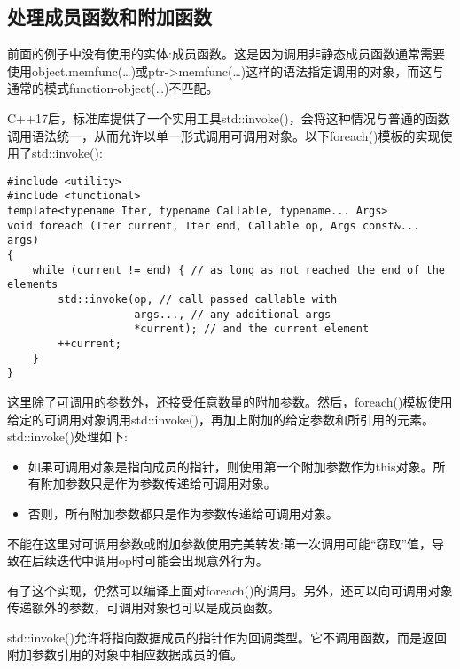 \subsection{处理成员函数和附加函数}

前面的例子中没有使用的实体:成员函数。这是因为调用非静态成员函数通常需要使用object.memfunc(…)或ptr->memfunc(…)这样的语法指定调用的对象，而这与通常的模式function-object(…)不匹配。

C++17后，标准库提供了一个实用工具std::invoke()，会将这种情况与普通的函数调用语法统一，从而允许以单一形式调用可调用对象。以下foreach()模板的实现使用了std::invoke():

\begin{lstlisting}[style=styleCXX]
#include <utility>
#include <functional>
template<typename Iter, typename Callable, typename... Args>
void foreach (Iter current, Iter end, Callable op, Args const&... args)
{
	while (current != end) { // as long as not reached the end of the elements
		std::invoke(op, // call passed callable with
					args..., // any additional args
					*current); // and the current element
		++current;
	}
}
\end{lstlisting}

这里除了可调用的参数外，还接受任意数量的附加参数。然后，foreach()模板使用给定的可调用对象调用std::invoke()，再加上附加的给定参数和所引用的元素。std::invoke()处理如下:

\begin{itemize}
\item
如果可调用对象是指向成员的指针，则使用第一个附加参数作为this对象。所有附加参数只是作为参数传递给可调用对象。

\item
否则，所有附加参数都只是作为参数传递给可调用对象。
\end{itemize}

不能在这里对可调用参数或附加参数使用完美转发:第一次调用可能“窃取”值，导致在后续迭代中调用op时可能会出现意外行为。

有了这个实现，仍然可以编译上面对foreach()的调用。另外，还可以向可调用对象传递额外的参数，可调用对象也可以是成员函数。

\begin{tcolorbox}[colback=webgreen!5!white,colframe=webgreen!75!black]
\hspace*{0.75cm}std::invoke()允许将指向数据成员的指针作为回调类型。它不调用函数，而是返回附加参数引用的对象中相应数据成员的值。
\end{tcolorbox}

